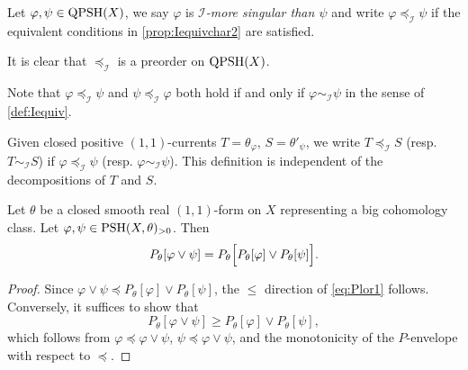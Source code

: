 \begin{definition}\label{def:Imoresing}
    Let $\varphi,\psi\in \mathrm{QPSH}(X)$, we say $\varphi$ is \emph{$\mathcal{I}$-more singular than $\psi$} and write $\varphi\preceq_{\mathcal{I}} \psi$ if the equivalent conditions in \cref{prop:Iequivchar2} are satisfied.
\end{definition}
It is clear that $\preceq_{\mathcal{I}}$ is a preorder on $\mathrm{QPSH}(X)$.

Note that $\varphi\preceq_{\mathcal{I}}\psi$ and $\psi\preceq_{\mathcal{I}}\varphi$ both hold if and only if $\varphi\sim_{\mathcal{I}}\psi$ in the sense of \cref{def:Iequiv}.

Given closed positive $(1,1)$-currents $T=\theta_{\varphi}$, $S=\theta'_{\psi}$, we write $T\preceq_{\mathcal{I}} S$ (resp. $T\sim_{\mathcal{I}} S$) if $\varphi\preceq_{\mathcal{I}} \psi$ (resp. $\varphi\sim_{\mathcal{I}} \psi$). This definition is independent of the decompositions of $T$ and $S$.

\begin{lemma}\label{lma:Plor1}
    Let $\theta$ be a closed smooth real $(1,1)$-form on $X$ representing a big cohomology class.
    Let $\varphi,\psi\in \mathrm{PSH}(X,\theta)_{>0}$. Then
    \begin{equation}\label{eq:Plor1}
    P_{\theta}[\varphi\lor \psi]=P_{\theta}\Bigl[ P_{\theta}[\varphi]\lor P_{\theta}[\psi] \Bigr].
    \end{equation}
\end{lemma}
\begin{proof}
    Since $\varphi\lor \psi\preceq P_{\theta}[\varphi]\lor P_{\theta}[\psi]$, the $\leq$ direction of \eqref{eq:Plor1} follows. Conversely, it suffices to show that
    \[
    P_{\theta}[\varphi\lor \psi]\geq P_{\theta}[\varphi]\lor P_{\theta}[\psi],
    \]
    which follows from $\varphi\preceq\varphi\lor\psi$, $\psi\preceq\varphi\lor\psi$, and the monotonicity of the $P$-envelope with respect to $\preceq$.
\end{proof}

